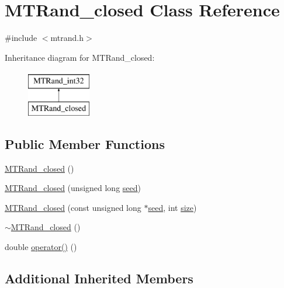 \hypertarget{class_m_t_rand__closed}{\section{M\-T\-Rand\-\_\-closed Class Reference}
\label{class_m_t_rand__closed}
}


{\ttfamily \#include $<$mtrand.\-h$>$}

Inheritance diagram for M\-T\-Rand\-\_\-closed\-:\begin{figure}[H]
\begin{center}
\leavevmode
\includegraphics[height=2.000000cm]{class_m_t_rand__closed}
\end{center}
\end{figure}
\subsection*{Public Member Functions}
\begin{DoxyCompactItemize}
\item 
\hyperlink{class_m_t_rand__closed_a09b3b21b3cb35d04f2b6c290a817b2e8}{M\-T\-Rand\-\_\-closed} ()
\item 
\hyperlink{class_m_t_rand__closed_ad5dc83250b16f22d4693a18b51816271}{M\-T\-Rand\-\_\-closed} (unsigned long \hyperlink{class_m_t_rand__int32_a0c57076fe30358e0700a7ce1baa0ea27}{seed})
\item 
\hyperlink{class_m_t_rand__closed_a37e322f97253b7013823a267bcfe82d1}{M\-T\-Rand\-\_\-closed} (const unsigned long $\ast$\hyperlink{class_m_t_rand__int32_a0c57076fe30358e0700a7ce1baa0ea27}{seed}, int \hyperlink{crea__e__controlla__i__catalizzatori_8m_ae113ea7f9e515a12ac4b5595c6faf61e}{size})
\item 
\hyperlink{class_m_t_rand__closed_a46567ee841b5f54b305ac051ac837a8c}{$\sim$\-M\-T\-Rand\-\_\-closed} ()
\item 
double \hyperlink{class_m_t_rand__closed_ad0c535263b63c95029523183f672f62d}{operator()} ()
\end{DoxyCompactItemize}
\subsection*{Additional Inherited Members}



